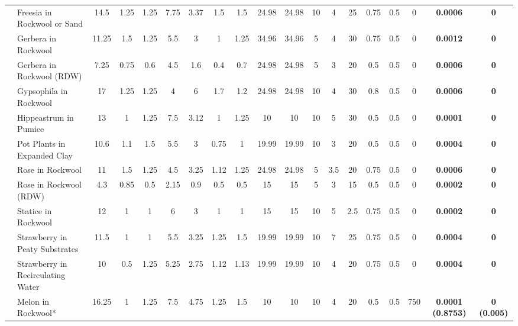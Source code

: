 \documentclass[
  letterpaper,
  DIV=11,
  numbers=noendperiod]{scrreprt}
\begin{document}
\begin{landscape}
\begin{longtable}[t]{llccccccccccccccc>{}c>{}c}
\nopagebreak
 & Freesia in Rockwool or Sand & 14.5 & 1.25 & 1.25 & 7.75 & 3.37 & 1.5 & 1.5 & 24.98 & 24.98 & 10 & 4 & 25 & 0.75 & 0.5 & 0 & \textbf{0.0006} & \textbf{0}\\
\nopagebreak
 & Gerbera in Rockwool & 11.25 & 1.5 & 1.25 & 5.5 & 3 & 1 & 1.25 & 34.96 & 34.96 & 5 & 4 & 30 & 0.75 & 0.5 & 0 & \textbf{0.0012} & \textbf{0}\\
\nopagebreak
 & Gerbera in Rockwool (RDW) & 7.25 & 0.75 & 0.6 & 4.5 & 1.6 & 0.4 & 0.7 & 24.98 & 24.98 & 5 & 3 & 20 & 0.5 & 0.5 & 0 & \textbf{0.0006} & \textbf{0}\\
\nopagebreak
 & Gypsophila in Rockwool & 17 & 1.25 & 1.25 & 4 & 6 & 1.7 & 1.2 & 24.98 & 24.98 & 10 & 4 & 30 & 0.8 & 0.5 & 0 & \textbf{0.0006} & \textbf{0}\\
\nopagebreak
 & Hippeastrum in Pumice & 13 & 1 & 1.25 & 7.5 & 3.12 & 1 & 1.25 & 10 & 10 & 10 & 5 & 30 & 0.5 & 0.5 & 0 & \textbf{0.0001} & \textbf{0}\\
\nopagebreak
 & Pot Plants in Expanded Clay & 10.6 & 1.1 & 1.5 & 5.5 & 3 & 0.75 & 1 & 19.99 & 19.99 & 10 & 3 & 20 & 0.5 & 0.5 & 0 & \textbf{0.0004} & \textbf{0}\\
\nopagebreak
 & Rose in Rockwool & 11 & 1.5 & 1.25 & 4.5 & 3.25 & 1.12 & 1.25 & 24.98 & 24.98 & 5 & 3.5 & 20 & 0.75 & 0.5 & 0 & \textbf{0.0006} & \textbf{0}\\
\nopagebreak
 & Rose in Rockwool (RDW) & 4.3 & 0.85 & 0.5 & 2.15 & 0.9 & 0.5 & 0.5 & 15 & 15 & 5 & 3 & 15 & 0.5 & 0.5 & 0 & \textbf{0.0002} & \textbf{0}\\
\nopagebreak
\multirow[t]{-22}{*}{\raggedright\arraybackslash Floriculture} & Statice in Rockwool & 12 & 1 & 1 & 6 & 3 & 1 & 1 & 15 & 15 & 10 & 5 & 2.5 & 0.75 & 0.5 & 0 & \textbf{0.0002} & \textbf{0}\\
\cmidrule{1-19}\pagebreak[0]
 & Strawberry in Peaty Substrates & 11.5 & 1 & 1 & 5.5 & 3.25 & 1.25 & 1.5 & 19.99 & 19.99 & 10 & 7 & 25 & 0.75 & 0.5 & 0 & \textbf{0.0004} & \textbf{0}\\
\nopagebreak
 & Strawberry in Recirculating Water & 10 & 0.5 & 1.25 & 5.25 & 2.75 & 1.12 & 1.13 & 19.99 & 19.99 & 10 & 4 & 20 & 0.75 & 0.5 & 0 & \textbf{0.0004} & \textbf{0}\\
\nopagebreak
\multirow[t]{-3}{*}{\raggedright\arraybackslash Fruticulture} & Melon in Rockwool* & 16.25 & 1 & 1.25 & 7.5 & 4.75 & 1.25 & 1.5 & 10 & 10 & 10 & 4 & 20 & 0.5 & 0.5 & 750 & \textbf{0.0001 (0.8753)} & \textbf{0 (0.005)}\\*

\end{longtable}

\endgroup{}
\end{landscape}
\renewcommand{\arraystretch}{1}
\end{document}
